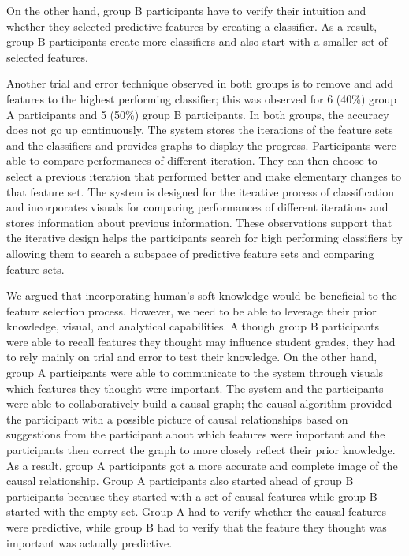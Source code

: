 On the other hand, group B participants have to verify their intuition and whether they selected predictive features by creating a classifier. As a result, group B participants create more classifiers and also start with a smaller set of selected features.

Another trial and error technique observed in both groups is to remove and add features to the highest performing classifier; this was observed for 6 (40\%) group A participants and 5 (50\%) group B participants. In both groups, the accuracy does not go up continuously. The system stores the iterations of the feature sets and the classifiers and provides graphs to display the progress. Participants were able to compare performances of different iteration. They can then choose to select a previous iteration that performed better and make elementary changes to that feature set. The system is designed for the iterative process of classification and incorporates visuals for comparing performances of different iterations and stores information about previous information. These observations support that the iterative design helps the participants search for high performing classifiers by allowing them to search a subspace of predictive feature sets and comparing feature sets.

We argued that incorporating human’s soft knowledge would be beneficial to the feature selection process. However, we need to be able to leverage their prior knowledge, visual, and analytical capabilities. Although group B participants were able to recall features they thought may influence student grades, they had to rely mainly on trial and error to test their knowledge. On the other hand, group A participants were able to communicate to the system through visuals which features they thought were important. The system and the participants were able to collaboratively build a causal graph; the causal algorithm provided the participant with a possible picture of causal relationships based on suggestions from the participant about which features were important and the participants then correct the graph to more closely reflect their prior knowledge. As a result, group A participants got a more accurate and complete image of the causal relationship. Group A participants also started ahead of group B participants because they started with a set of causal features while group B started with the empty set. Group A had to verify whether the causal features were predictive, while group B had to verify that the feature they thought was important was actually predictive.

